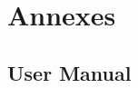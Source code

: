 \chapter{Annexes}
\section{User Manual} \label{usermanual}
\newpage\null\thispagestyle{empty}\newpage
